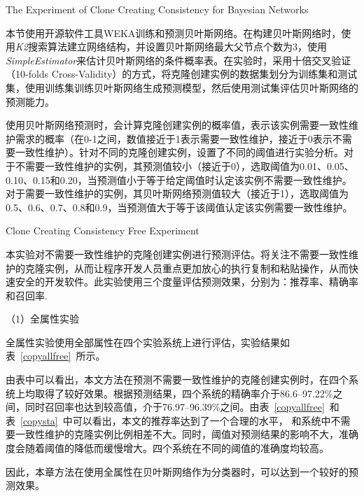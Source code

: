{The Experiment of Clone Creating Consistency for Bayesian Networks}

本节使用开源软件工具WEKA训练和预测贝叶斯网络。在构建贝叶斯网络时，使用{\em K2}搜索算法建立网络结构，并设置贝叶斯网络最大父节点个数为3，使用{\em  SimpleEstimator}来估计贝叶斯网络的条件概率表。在实验时，采用十倍交叉验证（10-folds Cross-Validity）的方式，将克隆创建实例的数据集划分为训练集和测试集，使用训练集训练贝叶斯网络生成预测模型，然后使用测试集评估贝叶斯网络的预测能力。

使用贝叶斯网络预测时，会计算克隆创建实例的概率值，表示该实例需要一致性维护需求的概率（在0-1之间，数值接近于1表示需要一致性维护，接近于0表示不需要一致性维护）。针对不同的克隆创建实例，设置了不同的阈值进行实验分析。对于不需要一致性维护的实例，其预测值较小（接近于0），选取阈值为0.01、0.05、0.10、0.15和0.20，当预测值小于等于给定阈值时认定该实例不需要一致性维护。对于需要一致性维护的实例，其贝叶斯网络预测值较大（接近于1），选取阈值为0.5、0.6、0.7、0.8和0.9，当预测值大于等于该阈值认定该实例需要一致性维护。

{Clone Creating Consistency Free Experiment}

本实验对不需要一致性维护的克隆创建实例进行预测评估。将关注不需要一致性维护的克隆实例，从而让程序开发人员重点更加放心的执行复制和粘贴操作，从而快速安全的开发软件。此实验使用三个度量评估预测效果，分别为：推荐率、精确率和召回率.

（1）全属性实验

全属性实验使用全部属性在四个实验系统上进行评估，实验结果如表~\ref{copyallfree}~所示。

由表中可以看出，本文方法在预测不需要一致性维护的克隆创建实例时，在四个系统上均取得了较好效果。根据预测结果，四个系统的精确率介于86.6--97.22\%之间，同时召回率也达到较高值，介于76.97--96.39\%之间。由表~\ref{copyallfree}~和表~\ref{copysta}~中可以看出，本文的推荐率达到了一个合理的水平， 和系统中不需要一致性维护的克隆实例比例相差不大。同时，阈值对预测结果的影响不大，准确度会随着阈值的降低而缓慢增大。四个系统在不同的阈值的准确度均较高。


因此，本章方法在使用全属性在贝叶斯网络作为分类器时，可以达到一个较好的预测效果。

